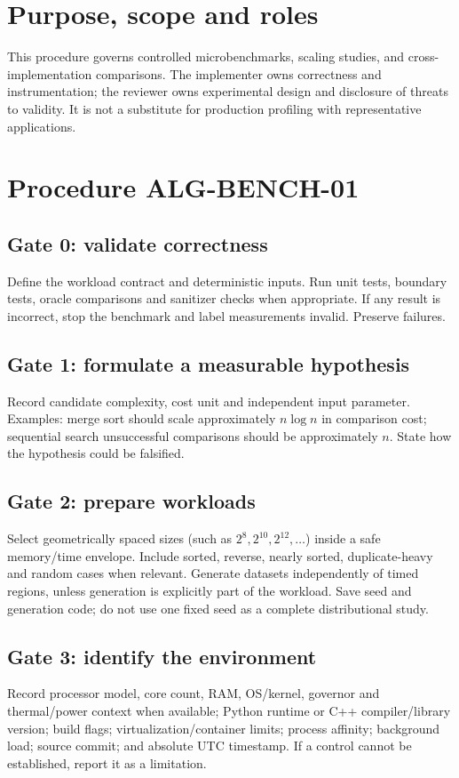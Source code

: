 \documentclass[11pt,letterpaper]{article}
\begin{document}
\tableofcontents
\clearpage
{}
\section{Purpose, scope and roles}
This procedure governs controlled microbenchmarks, scaling studies, and cross-implementation comparisons. The implementer owns correctness and instrumentation; the reviewer owns experimental design and disclosure of threats to validity. It is not a substitute for production profiling with representative applications.
\section{Procedure ALG-BENCH-01}
\subsection{Gate 0: validate correctness}
Define the workload contract and deterministic inputs. Run unit tests, boundary tests, oracle comparisons and sanitizer checks when appropriate. If any result is incorrect, stop the benchmark and label measurements invalid. Preserve failures.
\subsection{Gate 1: formulate a measurable hypothesis}
Record candidate complexity, cost unit and independent input parameter. Examples: merge sort should scale approximately $n\log n$ in comparison cost; sequential search unsuccessful comparisons should be approximately $n$. State how the hypothesis could be falsified.
\subsection{Gate 2: prepare workloads}
Select geometrically spaced sizes (such as $2^8,2^{10},2^{12},\ldots$) inside a safe memory/time envelope. Include sorted, reverse, nearly sorted, duplicate-heavy and random cases when relevant. Generate datasets independently of timed regions, unless generation is explicitly part of the workload. Save seed and generation code; do not use one fixed seed as a complete distributional study.
\subsection{Gate 3: identify the environment}
Record processor model, core count, RAM, OS/kernel, governor and thermal/power context when available; Python runtime or C++ compiler/library version; build flags; virtualization/container limits; process affinity; background load; source commit; and absolute UTC timestamp. If a control cannot be established, report it as a limitation.
\end{document}
